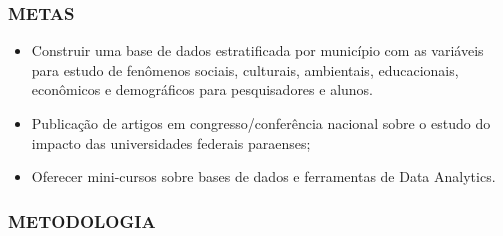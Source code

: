 \documentclass[]{article}
\providecommand{\tightlist}{%
  \setlength{\itemsep}{0pt}\setlength{\parskip}{0pt}}
\begin{document}
\hypertarget{metas}{%
\subsubsection{METAS}\label{metas}}

\begin{itemize}
\tightlist
\item
  Construir uma base de dados estratificada por município com as
  variáveis para estudo de fenômenos sociais, culturais, ambientais,
  educacionais, econômicos e demográficos para pesquisadores e alunos.
\item
  Publicação de artigos em congresso/conferência nacional sobre o estudo
  do impacto das universidades federais paraenses;
\item
  Oferecer mini-cursos sobre bases de dados e ferramentas de Data
  Analytics.
\end{itemize}

\hypertarget{metodologia}{%
\subsubsection{METODOLOGIA}\label{metodologia}}
\end{document}
